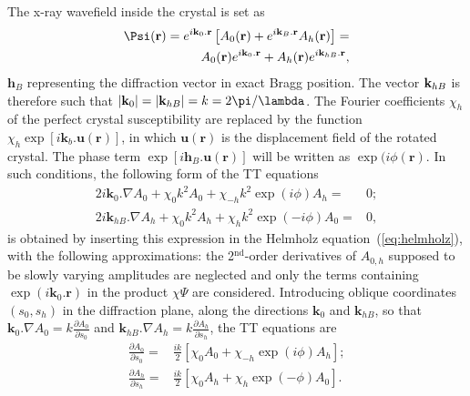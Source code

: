 \documentclass[preprint]{iucr}              %
\begin{document}
The x-ray wavefield inside the crystal is set as
\begin{subequations}
\label{eq:wavefieldappendix}
\begin{align}
        \Psi(\textbf r) = 
        e^{i \textbf k_0 . \textbf r} \left[
        A_0(\textbf r) + e^{i \textbf k_{B} . \textbf r} A_h(\textbf r)
        \right] = 
        \nonumber\\
        A_0(\textbf r) e^{i \textbf k_0 . \textbf r} + A_{h}(\textbf r) e^{i \textbf k_{hB} . \textbf r},
\end{align}
\end{subequations}
$\textbf{h}_B$ representing the diffraction vector in exact Bragg position. The vector $\textbf k_{hB}$  is therefore such that $|\textbf k_{0}|=|\textbf k_{hB}|=k=2 \pi / \lambda$. The Fourier coefficients $\chi_h$ of the perfect crystal susceptibility are replaced by the function $\chi_h \exp[i\textbf{k}_b.\textbf{u}(\textbf{r})]$, in which $\textbf{u}(\textbf{r})$ is the displacement field of the rotated crystal. The phase term $\exp[i\textbf{h}_B.\textbf{u}(\textbf{r})]$ will be written as $\exp(i\phi(\textbf{r})$. In such conditions, the following form of the TT equations
\begin{subequations}
\label{eq:TTvectorappendix}
\begin{align}
2 i \textbf{k}_0 . \nabla A_0 + \chi_0 k^2 A_0 + \chi_{-h} k^2 \exp(i\phi) A_h =& 0; \\
2 i \textbf{k}_{hB} . \nabla A_h + \chi_0 k^2 A_h + \chi_{h} k^2 \exp(-i\phi) A_0 =& 0,
\end{align}
\end{subequations}
is obtained by inserting this expression in the Helmholz equation~(\ref{eq:helmholz}), with the following approximations: the 2$^{\text{nd}}$-order derivatives of $A_{0,h}$ supposed to be slowly varying amplitudes are neglected and only the terms containing $\exp(i\textbf{k}_0.\textbf{r})$ in the product $\chi\Psi$ are considered. Introducing oblique coordinates $(s_0,s_h)$ in the diffraction plane, along the directions $\textbf{k}_0$ and $\textbf{k}_{hB}$, so that $\textbf{k}_0.\nabla A_0=k\frac{\partial A_0}{\partial s_0}$ and  $\textbf{k}_{hB}.\nabla A_h=k\frac{\partial A_h}{\partial s_h}$, the TT equations are
\begin{subequations}
\begin{align}
\frac{\partial A_0}{\partial s_0} =& \frac{ik}{2} \left[ \chi_0 A_0+ \chi_{-h} \exp(i\phi) A_h\right]; \\
\frac{\partial A_h}{\partial s_h} =& \frac{ik}{2} \left[ \chi_0 A_h+ \chi_{h} \exp(-\phi) A_0\right].
\end{align}
\end{subequations}
\end{document}
